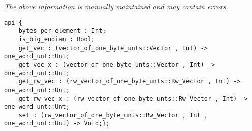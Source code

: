 \label{api:Pack\_Unt}

{\tiny \it The above information is manually maintained and may contain errors.}
\begin{verbatim}
api {
    bytes_per_element : Int;
    is_big_endian : Bool;
    get_vec : (vector_of_one_byte_unts::Vector , Int) -> one_word_unt::Unt;
    get_vec_x : (vector_of_one_byte_unts::Vector , Int) -> one_word_unt::Unt;
    get_rw_vec : (rw_vector_of_one_byte_unts::Rw_Vector , Int) -> one_word_unt::Unt;
    get_rw_vec_x : (rw_vector_of_one_byte_unts::Rw_Vector , Int) -> one_word_unt::Unt;
    set : (rw_vector_of_one_byte_unts::Rw_Vector , Int , one_word_unt::Unt) -> Void;};
\end{verbatim}

